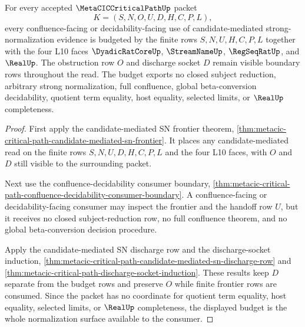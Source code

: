 \begin{theorem}
\label{thm:metacic-critical-path-candidate-normalization-budget}
For every accepted $\MetaCICCriticalPathUp$ packet
$$
K=(S,N,O,U,D,H,C,P,L),
$$
every confluence-facing or decidability-facing use of candidate-mediated strong-normalization evidence is budgeted by the finite rows $S,N,U,H,C,P,L$ together with the four L10 faces $\DyadicRatCoreUp$, $\StreamNameUp$, $\RegSeqRatUp$, and $\RealUp$. The obstruction row $O$ and discharge socket $D$ remain visible boundary rows throughout the read. The budget exports no closed subject reduction, arbitrary strong normalization, full confluence, global beta-conversion decidability, quotient term equality, host equality, selected limits, or $\RealUp$ completeness.
\end{theorem}
\begin{proof}
First apply the candidate-mediated SN frontier theorem, \autoref{thm:metacic-critical-path-candidate-mediated-sn-frontier}. It places any candidate-mediated read on the finite rows $S,N,U,D,H,C,P,L$ and the four L10 faces, with $O$ and $D$ still visible to the surrounding packet.

Next use the confluence-decidability consumer boundary, \autoref{thm:metacic-critical-path-confluence-decidability-consumer-boundary}. A confluence-facing or decidability-facing consumer may inspect the frontier and the handoff row $U$, but it receives no closed subject-reduction row, no full confluence theorem, and no global beta-conversion decision procedure.

Apply the candidate-mediated SN discharge row and the discharge-socket induction, \autoref{thm:metacic-critical-path-candidate-mediated-sn-discharge-row} and \autoref{thm:metacic-critical-path-discharge-socket-induction}. These results keep $D$ separate from the budget rows and preserve $O$ while finite frontier rows are consumed. Since the packet has no coordinate for quotient term equality, host equality, selected limits, or $\RealUp$ completeness, the displayed budget is the whole normalization surface available to the consumer.
\end{proof}

